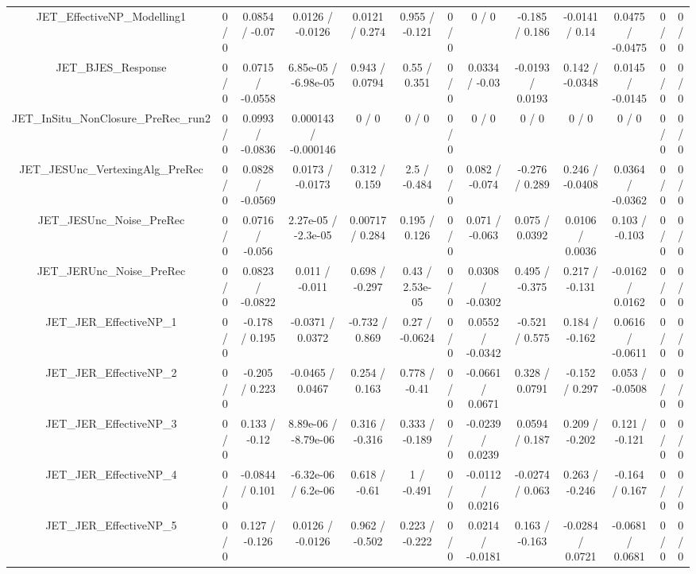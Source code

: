 \documentclass[10pt]{article}
\begin{document}
\begin{table}[htbp]
\begin{center}
\begin{tabular}{|c|c|c|c|c|c|c|c|c|c|c|c|c|}
  JET_EffectiveNP_Modelling1 & 0 / 0 & 0.0854 / -0.07 & 0.0126 / -0.0126 & 0.0121 / 0.274 & 0.955 / -0.121 & 0 / 0 & 0 / 0 & -0.185 / 0.186 & -0.0141 / 0.14 & 0.0475 / -0.0475 & 0 / 0 & 0 / 0 \\ 
  JET_BJES_Response & 0 / 0 & 0.0715 / -0.0558 & 6.85e-05 / -6.98e-05 & 0.943 / 0.0794 & 0.55 / 0.351 & 0 / 0 & 0.0334 / -0.03 & -0.0193 / 0.0193 & 0.142 / -0.0348 & 0.0145 / -0.0145 & 0 / 0 & 0 / 0 \\ 
  JET_InSitu_NonClosure_PreRec_run2 & 0 / 0 & 0.0993 / -0.0836 & 0.000143 / -0.000146 & 0 / 0 & 0 / 0 & 0 / 0 & 0 / 0 & 0 / 0 & 0 / 0 & 0 / 0 & 0 / 0 & 0 / 0 \\ 
  JET_JESUnc_VertexingAlg_PreRec & 0 / 0 & 0.0828 / -0.0569 & 0.0173 / -0.0173 & 0.312 / 0.159 & 2.5 / -0.484 & 0 / 0 & 0.082 / -0.074 & -0.276 / 0.289 & 0.246 / -0.0408 & 0.0364 / -0.0362 & 0 / 0 & 0 / 0 \\ 
  JET_JESUnc_Noise_PreRec & 0 / 0 & 0.0716 / -0.056 & 2.27e-05 / -2.3e-05 & 0.00717 / 0.284 & 0.195 / 0.126 & 0 / 0 & 0.071 / -0.063 & 0.075 / 0.0392 & 0.0106 / 0.0036 & 0.103 / -0.103 & 0 / 0 & 0 / 0 \\ 
  JET_JERUnc_Noise_PreRec & 0 / 0 & 0.0823 / -0.0822 & 0.011 / -0.011 & 0.698 / -0.297 & 0.43 / 2.53e-05 & 0 / 0 & 0.0308 / -0.0302 & 0.495 / -0.375 & 0.217 / -0.131 & -0.0162 / 0.0162 & 0 / 0 & 0 / 0 \\ 
  JET_JER_EffectiveNP_1 & 0 / 0 & -0.178 / 0.195 & -0.0371 / 0.0372 & -0.732 / 0.869 & 0.27 / -0.0624 & 0 / 0 & 0.0552 / -0.0342 & -0.521 / 0.575 & 0.184 / -0.162 & 0.0616 / -0.0611 & 0 / 0 & 0 / 0 \\ 
  JET_JER_EffectiveNP_2 & 0 / 0 & -0.205 / 0.223 & -0.0465 / 0.0467 & 0.254 / 0.163 & 0.778 / -0.41 & 0 / 0 & -0.0661 / 0.0671 & 0.328 / 0.0791 & -0.152 / 0.297 & 0.053 / -0.0508 & 0 / 0 & 0 / 0 \\ 
  JET_JER_EffectiveNP_3 & 0 / 0 & 0.133 / -0.12 & 8.89e-06 / -8.79e-06 & 0.316 / -0.316 & 0.333 / -0.189 & 0 / 0 & -0.0239 / 0.0239 & 0.0594 / 0.187 & 0.209 / -0.202 & 0.121 / -0.121 & 0 / 0 & 0 / 0 \\ 
  JET_JER_EffectiveNP_4 & 0 / 0 & -0.0844 / 0.101 & -6.32e-06 / 6.2e-06 & 0.618 / -0.61 & 1 / -0.491 & 0 / 0 & -0.0112 / 0.0216 & -0.0274 / 0.063 & 0.263 / -0.246 & -0.164 / 0.167 & 0 / 0 & 0 / 0 \\ 
  JET_JER_EffectiveNP_5 & 0 / 0 & 0.127 / -0.126 & 0.0126 / -0.0126 & 0.962 / -0.502 & 0.223 / -0.222 & 0 / 0 & 0.0214 / -0.0181 & 0.163 / -0.163 & -0.0284 / 0.0721 & -0.0681 / 0.0681 & 0 / 0 & 0 / 0 \\ 

\end{tabular}
\end{center}
\end{table}
\end{document}
